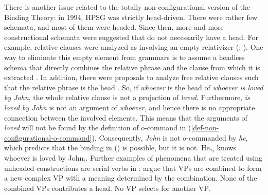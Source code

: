 \documentclass[output=paper,biblatex,babelshorthands,newtxmath,draftmode,colorlinks,citecolor=brown]{langscibook}
\begin{document}
There is another issue related to the totally non-configurational version of the Binding Theory: in 1994, HPSG was strictly
head-driven. There were rather few schemata, and most of them were headed. Since then, more and more
constructional schemata were suggested that do not necessarily have a head. For example, relative
clauses were analyzed as involving an empty relativizer (\citealp[Chapter~5]{ps2}; ). One way to eliminate this empty element from
grammars is to assume a headless schema that directly combines the relative phrase and the clause from which
it is extracted \parencites[Section~2.7]{Mueller99b}[522]{Sag:10b}[]{MuellerCurrentApproaches}. In addition, there were proposals to analyze free
relative clauses such that the relative phrase is the head
\citep[]{WK2003a}. So, if \emph{whoever} is the head of \emph{whoever is loved by John}, the whole
relative clause is not a projection of \emph{loved}. Furthermore, \emph{is loved by John} is not an argument
of \emph{whoever}, and hence there is no appropriate connection between the involved elements. 
This means that the arguments of \emph{loved} will not be found by the definition of o-command in
(\ref{def-non-configurational-o-command}). Consequently, \emph{John} is not o-commanded by
\emph{he}, which predicts that the binding in () is possible, but it is not. 
\ea
He$_{*i}$ knows whoever is loved by John$_i$.
\z
Further examples of phenomena that are treated using unheaded constructions are serial verbs in
: \citet{ML2009a} argue that VPs are combined to form a new complex VP with a
meaning determined by the combination. None of the combined VPs contributes a head. No VP selects
for another VP. 

\end{document}
